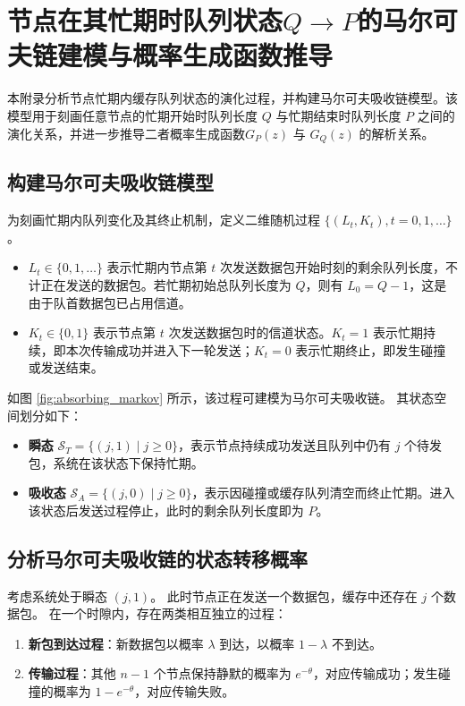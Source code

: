 \chapter[节点在忙期时队列状态Q到P的马尔可夫链建模与概率生成函数推导]{节点在其忙期时队列状态$Q \to P$的马尔可夫链建模与概率生成函数推导}
\label{app:proof_appendix2}

本附录分析节点忙期内缓存队列状态的演化过程，并构建马尔可夫吸收链模型\cite{2008_Markov_absorb}。该模型用于刻画任意节点的忙期开始时队列长度 $Q$ 与忙期结束时队列长度 $P$ 之间的演化关系，并进一步推导二者概率生成函数$G_P(z)$ 与 $G_Q(z)$ 的解析关系。

\section{构建马尔可夫吸收链模型}

为刻画忙期内队列变化及其终止机制，定义二维随机过程 $\{(L_t,K_t),t=0,1,\dots\}$。
\begin{itemize}
	\item $L_t \in \{0,1,\dots\}$ 表示忙期内节点第 $t$ 次发送数据包开始时刻的剩余队列长度，不计正在发送的数据包。若忙期初始总队列长度为 $Q$，则有 $L_0=Q-1$，这是由于队首数据包已占用信道。
	\item $K_t \in \{0,1\}$ 表示节点第 $t$ 次发送数据包时的信道状态。$K_t=1$ 表示忙期持续，即本次传输成功并进入下一轮发送；$K_t=0$ 表示忙期终止，即发生碰撞或发送结束。
\end{itemize}

如图 \ref{fig:absorbing_markov} 所示，该过程可建模为马尔可夫吸收链。
其状态空间划分如下：
\begin{itemize}
	\item \textbf{瞬态} $\mathcal{S}_T=\{(j,1)\mid j\ge 0\}$，表示节点持续成功发送且队列中仍有 $j$ 个待发包，系统在该状态下保持忙期。
	\item \textbf{吸收态} $\mathcal{S}_A=\{(j,0)\mid j\ge 0\}$，表示因碰撞或缓存队列清空而终止忙期。进入该状态后发送过程停止，此时的剩余队列长度即为 $P$。
\end{itemize}


\section[分析马尔可夫吸收链的状态转移概率]{分析马尔可夫吸收链的状态转移概率}

考虑系统处于瞬态 $(j,1)$。
此时节点正在发送一个数据包，缓存中还存在 $j$ 个数据包。
在一个时隙内，存在两类相互独立的过程：
\begin{enumerate}
	\item \textbf{新包到达过程}：新数据包以概率 $\lambda$ 到达，以概率 $1-\lambda$ 不到达。
	\item \textbf{传输过程}：其他 $n-1$ 个节点保持静默的概率为 $e^{-\theta}$，对应传输成功；发生碰撞的概率为 $1-e^{-\theta}$，对应传输失败。
\end{enumerate}

